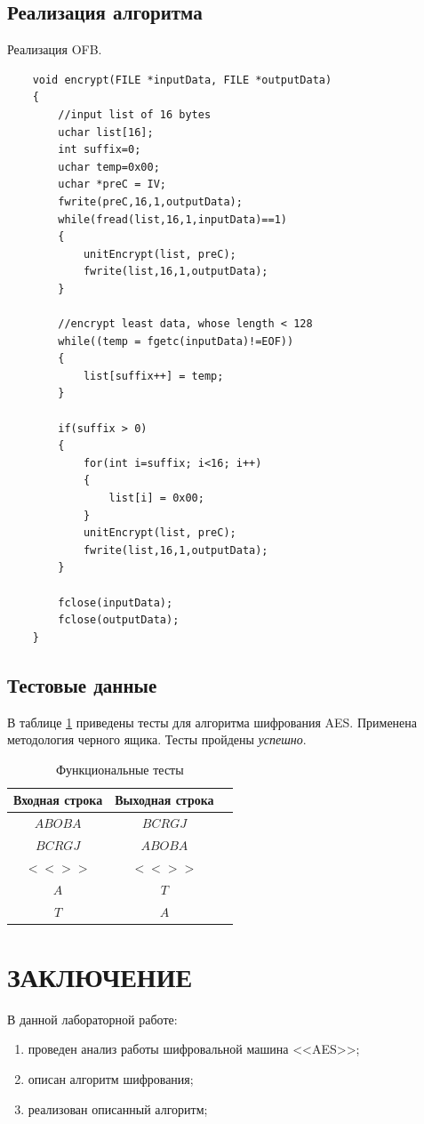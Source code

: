 \subsection{Реализация алгоритма}

Реализация OFB.

\begin{lstlisting}
    void encrypt(FILE *inputData, FILE *outputData)
    {
        //input list of 16 bytes
        uchar list[16];
        int suffix=0;
        uchar temp=0x00;
        uchar *preC = IV;
        fwrite(preC,16,1,outputData);
        while(fread(list,16,1,inputData)==1)
        {
            unitEncrypt(list, preC);
            fwrite(list,16,1,outputData);
        }
    
        //encrypt least data, whose length < 128
        while((temp = fgetc(inputData)!=EOF))
        {
            list[suffix++] = temp;
        }
    
        if(suffix > 0)
        {
            for(int i=suffix; i<16; i++)
            {
                list[i] = 0x00;
            }
            unitEncrypt(list, preC);
            fwrite(list,16,1,outputData);
        }
    
        fclose(inputData);
        fclose(outputData);
    } 
\end{lstlisting}


\subsection{Тестовые данные}

В таблице \ref{tbl:functional_test} приведены тесты для алгоритма шифрования AES. 
Применена методология черного ящика. Тесты пройдены \textit{успешно}.



\begin{table}[ht!]
	\begin{center}
		\captionsetup{justification=raggedright,singlelinecheck=off}
		\caption{\label{tbl:functional_test} Функциональные тесты}
		\begin{tabular}{|c|c|c|}
			\hline
			Входная строка & Выходная строка \\ 
			\hline
			$ABOBA$ & $BCRGJ$\\
			$BCRGJ$  & $ABOBA$\\
			$<<>>$  & $<<>>$ \\
            $A$ & $T$\\
			$T$  & $A$\\
			\hline
		\end{tabular}
	\end{center}
\end{table}

\clearpage
\section*{\large{ЗАКЛЮЧЕНИЕ}}
В данной лабораторной работе:
\begin{enumerate}
    \item проведен анализ работы шифровальной машина <<AES>>;
    \item описан алгоритм шифрования;
    \item реализован описанный алгоритм;
\end{enumerate}